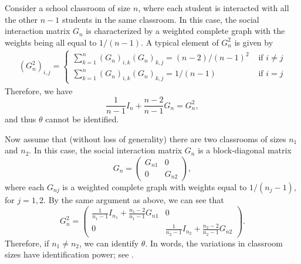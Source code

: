\documentclass[11pt, A4paper, openany, uplatex]{book}
\begin{document}
\begin{example}\upshape
	Consider a school classroom of size $n$, where each student is interacted with all the other $n-1$ students in the same classroom.
	In this case, the social interaction matrix $G_n$ is characterized by a weighted complete graph with the weights being all equal to $1/(n - 1)$.
	A typical element of $G_n^2$ is given by
	\begin{align*}
		(G_n^2)_{i,j} = \left\{\begin{array}{ll}
		\sum_{k = 1} ^n (G_n)_{i,k} (G_n)_{k,j} = (n - 2)/(n-1)^2& \text{ if $i \neq j$} \\
		\sum_{k = 1} ^n (G_n)_{i,k} (G_n)_{k,j} = 1/(n-1)& \text{ if $i = j$}
		\end{array}\right.
	\end{align*}
	Therefore, we have
	\[
	\frac{1}{n - 1} I_n + \frac{n-2}{n-1} G_n = G_n^2,
	\]
	and thus $\theta$ cannot be identified.
\end{example}

\begin{example}\upshape
	Now assume that (without loss of generality) there are two classrooms of sizes $n_1$ and $n_2$.
	In this case, the social interaction matrix $G_n$ is a block-diagonal matrix
	\[
		G_n = \left( \begin{array}{cc}
		G_{n1} & 0 \\
		0 & G_{n2}		
		\end{array}\right),
	\]
	where each $G_{nj}$ is a weighted complete graph with weights equal to $1/(n_j - 1)$, for $j = 1,2$.
	By the same argument as above, we can see that
	\[
	G^2_n = \left( \begin{array}{cc}
	\frac{1}{n_1 - 1} I_{n_1} + \frac{n_1 - 2}{n_1 - 1} G_{n1} & 0 \\
	0 & 	\frac{1}{n_2 - 1} I_{n_2} + \frac{n_2 - 2}{n_2 - 1} G_{n2}
	\end{array}\right) .
	\]
	Therefore, if $n_1 \neq n_2$, we can identify $\theta$.
	In words, the variations in classroom sizes have identification power; see \cite{lee2007identification}.
\end{example}
\end{document}
